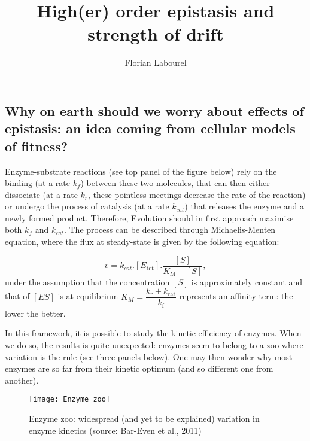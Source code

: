 \documentclass[]{article}
\title{High(er) order epistasis and strength of drift}
\author{Florian Labourel}
\date{}
\begin{document}
\maketitle

\hypertarget{why-on-earth-should-we-worry-about-effects-of-epistasis-an-idea-coming-from-cellular-models-of-fitness}{%
\subsection{Why on earth should we worry about effects of epistasis: an
idea coming from cellular models of
fitness?}\label{why-on-earth-should-we-worry-about-effects-of-epistasis-an-idea-coming-from-cellular-models-of-fitness}}

Enzyme-substrate reactions (see top panel of the figure below) rely on
the binding (at a rate \(k_f\)) between these two molecules, that can
then either dissociate (at a rate \(k_r\), these pointless meetings
decrease the rate of the reaction) or undergo the process of catalysis
(at a rate \(k_{cat}\)) that releases the enzyme and a newly formed
product. Therefore, Evolution should in first approach maximise both
\(k_f\) and \(k_{cat}\). The process can be described through
Michaelis-Menten equation, where the flux at steady-state is given by
the following equation:

\begin{equation}
v=k_{cat}.[E_\text{tot}].\frac{[S]}{K_\text{M}+[S]},
\label{EquiBHsimp}
\end{equation} \noindent under the assumption that the concentration
\([S]\) is approximately constant and that of \([ES]\) is at equilibrium
\(K_M=\dfrac{k_\text{r}+k_\text{cat}}{k_\text{f}}\) represents an
affinity term: the lower the better.

In this framework, it is possible to study the kinetic efficiency of
enzymes. When we do so, the results is quite unexpected: enzymes seem to
belong to a zoo where variation is the rule (see three panels below).
One may then wonder why most enzymes are so far from their kinetic
optimum (and so different one from another).

\begin{figure}

{\centering \texttt{[image: Enzyme\_zoo]} 

}

\caption{Enzyme zoo: widespread (and yet to be explained) variation in enzyme kinetics (source: Bar-Even et al., 2011)}\label{fig:enzoo}
\end{figure}
\end{document}
